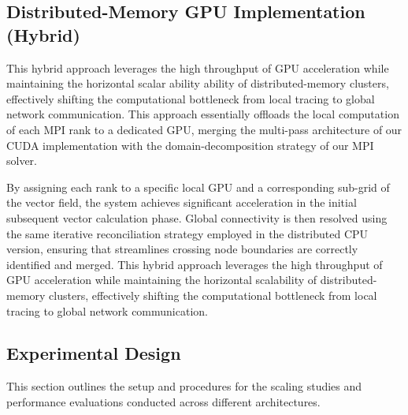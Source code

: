 \subsection{Distributed-Memory GPU Implementation (Hybrid)}

This hybrid approach leverages the high throughput of GPU acceleration while maintaining the horizontal scalar ability ability of distributed-memory clusters, effectively shifting the computational bottleneck from local tracing to global network communication.
This approach essentially offloads the local computation of each MPI rank to a dedicated GPU, merging the multi-pass architecture of our CUDA implementation with the domain-decomposition strategy of our MPI solver.

By assigning each rank to a specific local GPU and a corresponding sub-grid of the vector field, the system achieves significant acceleration in the initial subsequent vector calculation phase.
Global connectivity is then resolved using the same iterative reconciliation strategy employed in the distributed CPU version, ensuring that streamlines crossing node boundaries are correctly identified and merged.
This hybrid approach leverages the high throughput of GPU acceleration while maintaining the horizontal scalability of distributed-memory clusters, effectively shifting the computational bottleneck from local tracing to global network communication.

\subsection{Experimental Design}
This section outlines the setup and procedures for the scaling studies and performance evaluations conducted across different architectures.
